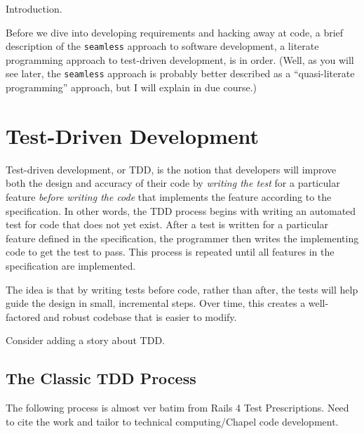 \label{Tutorial_Introduction}

\begin{TODO}
  Introduction.
\end{TODO}

Before we dive into developing requirements and hacking away at code, a brief description of 
the \lstinline{seamless} approach to software development, a literate programming approach to 
test-driven development, is in order.  (Well, as you will see later, the \lstinline{seamless} approach
is probably better described as a ``quasi-literate programming'' approach, but I will explain
in due course.)

\section{Test-Driven Development}
Test-driven development, or TDD, is the notion that developers will improve both the design and
accuracy of their code by \textit{writing the test} for a particular feature \textit{before writing the 
code} that implements the feature according to the specification. In other words, the TDD process 
begins with writing an automated test for code that does not yet 
exist. After a test is written for a particular feature defined in the specification, the 
programmer then writes the implementing code to get the test to pass. This process is repeated until
all features in the specification are implemented. 

The idea is that by writing tests before code, rather than after, the tests will help guide
the design in small, incremental steps. Over time, this creates a well-factored and robust
codebase that is easier to modify.

\begin{TODO}
Consider adding a story about TDD.
\end{TODO}

\subsection{The Classic TDD Process}\label{tdd-classic}

\begin{TODO} The following process is almost ver batim from Rails 4 Test Prescriptions. Need to 
cite the work and tailor to technical computing/Chapel code development.
\end{TODO}

